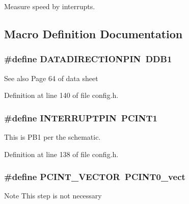 Measure speed by interrupts. 

\subsection{Macro Definition Documentation}
\subsubsection[{\texorpdfstring{D\+A\+T\+A\+D\+I\+R\+E\+C\+T\+I\+O\+N\+P\+IN}{DATADIRECTIONPIN}}]{\setlength{\rightskip}{0pt plus 5cm}\#define D\+A\+T\+A\+D\+I\+R\+E\+C\+T\+I\+O\+N\+P\+IN~D\+D\+B1}\hypertarget{group__speed_ga9142f4c677315955ad0ac6266b615d2c}{}\label{group__speed_ga9142f4c677315955ad0ac6266b615d2c}
\begin{DoxySeeAlso}{See also}
Page 64 of data sheet 
\end{DoxySeeAlso}


Definition at line 140 of file config.\+h.

\subsubsection[{\texorpdfstring{I\+N\+T\+E\+R\+R\+U\+P\+T\+P\+IN}{INTERRUPTPIN}}]{\setlength{\rightskip}{0pt plus 5cm}\#define I\+N\+T\+E\+R\+R\+U\+P\+T\+P\+IN~P\+C\+I\+N\+T1}\hypertarget{group__speed_ga984097794e94beb18c01b6fcbd8f399d}{}\label{group__speed_ga984097794e94beb18c01b6fcbd8f399d}


This is P\+B1 per the schematic. 



Definition at line 138 of file config.\+h.

\subsubsection[{\texorpdfstring{P\+C\+I\+N\+T\+\_\+\+V\+E\+C\+T\+OR}{PCINT_VECTOR}}]{\setlength{\rightskip}{0pt plus 5cm}\#define P\+C\+I\+N\+T\+\_\+\+V\+E\+C\+T\+OR~P\+C\+I\+N\+T0\+\_\+vect}\hypertarget{group__speed_ga77b45027297b1ff40b5b1249afb852e5}{}\label{group__speed_ga77b45027297b1ff40b5b1249afb852e5}
\begin{DoxyNote}{Note}
This step is not necessary 
\end{DoxyNote}



